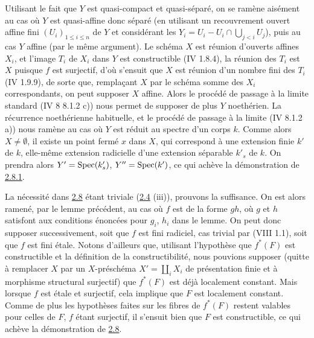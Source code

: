 \documentclass[10pt]{../fichiers-configuration-latex/smfart}
\begin{document}
Utilisant le fait que $Y$ est quasi-compact et quasi-séparé, on se
ramène aisément au cas où $Y$ est quasi-affine donc séparé (en
utilisant un recouvrement ouvert affine fini $(U_i)_{1\leq i\leq n}$
de $Y$ et considérant les $Y_i=U_i-U_i\cap \bigcup_{j< i} U_j$), puis
au cas $Y$ affine (par le même argument). Le schéma $X$ est réunion
d'ouverts affines $X_i$, et l'image $T_i$ de $X_i$ dans $Y$ est
constructible (\EGA IV 1.8.4), la réunion des $T_i$ est $X$ puisque $f$
est surjectif, d'où s'ensuit que $X$ est réunion d'un nombre fini des
$T_i$ (\EGA IV 1.9.9), de sorte que, remplaçant $X$ par le schéma
somme des $X_i$ correspondants, on peut supposer $X$ affine. Alors le
procédé de passage à la limite standard (\EGA IV 8 8.1.2 c)) nous
permet de supposer de plus $Y$ noethérien. La récurrence noethérienne
habituelle, et le procédé de passage à la limite (\EGA IV 8.1.2 a))
nous ramène au cas où $Y$ est réduit au spectre d'un corps $k$. Comme
alors $X\neq ∅$, il existe un point fermé $x$ dans $X$, qui
correspond à une extension finie $k'$ de $k$, elle-même extension
radicielle d'une extension séparable $k'_s$ de $k$. On prendra alors
$Y'=\operatorname{Spec}(k'_s)$, $Y''=\operatorname{Spec}(k')$, ce qui achève la démonstration de
\hyperref[IX.lem2.8.1]{2.8.1}.

La nécessité dans \hyperref[IX.prop2.8]{2.8} étant triviale (\hyperref[IX.prop2.4]{2.4} (iii)), prouvons la
suffisance. On est alors ramené, par le lemme précédent, au cas où $f$
est de la forme $gh$, où $g$ et $h$ satisfont aux conditions énoncées
pour $g_i$, $h_i$ dans le lemme. On peut donc supposer successivement,
soit que $f$ est fini radiciel, cas trivial par (VIII 1.1), soit que
$f$ est fini étale. Notons d'ailleurs que, utilisant l'hypothèse que
$f^{\ast}(F)$ est constructible et la définition de la
constructibilité, nous pouvions supposer (quitte à remplacer $X$ par
un $X$-préschéma $X'=\coprod_i X_i$ de présentation finie et à
morphisme structural surjectif) que $f^{\ast}(F)$ est déjà localement
constant. Mais lorsque $f$ est étale et surjectif, cela implique que
$F$ est localement constant. Comme de plus les hypothèses faites sur
les fibres de $f^{\ast}(F)$ restent valables pour celles de $F$, $f$
étant surjectif, il s'ensuit bien que $F$ est constructible, ce qui
achève la démonstration de \hyperref[IX.prop2.8]{2.8}.
\end{document}
